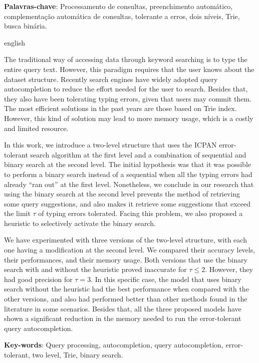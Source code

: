 \documentclass[
	12pt,				%
	openright,			%
	twoside,			%
	a4paper,			%
	english,			%
	spanish,			%
	brazil,				%
	]{abntex2}
\begin{document}
\begin{resumo}
\vspace{\onelineskip}
\noindent
\textbf{Palavras-chave}: Processamento de consultas, preenchimento automático, complementação automática de consultas, tolerante a erros, dois níveis, Trie, busca binária.
 

\end{resumo}

\begin{resumo}[Abstract]
 \begin{otherlanguage*}{english}

The traditional way of accessing data through keyword searching is to type the entire query text. However, this paradigm requires that the user knows about the dataset structure. Recently search engines have widely adopted query autocompletion to reduce the effort needed for the user to search. Besides that, they also have been tolerating typing errors, given that users may commit them. The most efficient solutions in the past years are those based on Trie index. However, this kind of solution may lead to more memory usage, which is a costly and limited resource.

In this work, we introduce a two-level structure that uses the ICPAN error-tolerant search algorithm at the first level and a combination of sequential and binary search at the second level. The initial hypothesis was that it was possible to perform a binary search instead of a sequential when all the typing errors had already ``ran out'' at the first level. Nonetheless, we conclude in our research that using the binary search at the second level prevents the method of retrieving some query suggestions, and also makes it retrieve some suggestions that exceed the limit $\tau$ of typing errors tolerated. Facing this problem, we also proposed a heuristic to selectively activate the binary search.

We have experimented with three versions of the two-level structure, with each one having a modification at the second level. We compared their accuracy levels, their performances, and their memory usage. Both versions that use the binary search with and without the heuristic proved inaccurate for $\tau \leq 2$. However, they had good precision for $\tau=3$. In this specific case, the model that uses binary search without the heuristic had the best performance when compared with the other versions, and also had performed better than other methods found in the literature in some scenarios. Besides that, all the three proposed models have shown a significant reduction in the memory needed to run the error-tolerant query autocompletion.


  \vspace{\onelineskip}
 
  \noindent 
  \textbf{Key-words}: Query processing, autocompletion, query autocompletion, error-tolerant, two level, Trie, binary search.
 \end{otherlanguage*}
\end{resumo}
\end{document}
